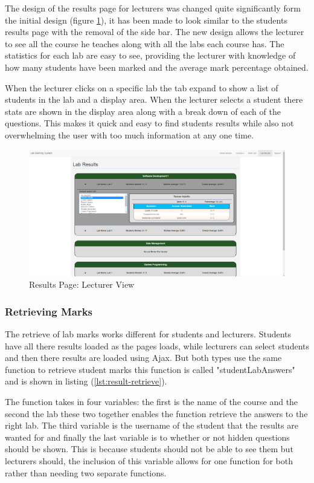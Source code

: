 \documentclass[12pt]{article}  %
\begin{document}
The design of the results page for lecturers was changed quite significantly form the initial design (figure \ref{fig:results-lecturer}), it has been made to look similar to the students results page with the removal of the side bar. The new design allows the lecturer to see all the course he teaches along with all the labs each course has. The statistics for each lab are easy to see, providing the lecturer with knowledge of how many students have been marked and the average mark percentage obtained.

When the lecturer clicks on a specific lab the tab expand to show a list of students in the lab and a display area. When the lecturer selects a student there stats are shown in the display area along with a break down of each of the questions. This makes it quick and easy to find students results while also not overwhelming the user with too much information at any one time.

\begin{figure}[H]
    \centering
    \includegraphics[width=1\textwidth]{images/implementation/lecturer-results-page.png}
    \caption{Results Page: Lecturer View}
    \label{fig:results-lecturer}
\end{figure}


\subsubsection{Retrieving Marks}

The retrieve of lab marks works different for students and lecturers. Students have all there results loaded as the pages loads, while lecturers can select students and then there results are loaded using Ajax. But both types use the same function to retrieve student marks this function is called "studentLabAnswers" and is shown in listing (\ref{lst:result-retrieve}). 

The function takes in four variables: the first is the name of the course and the second the lab these two together enables the function retrieve the answers to the right lab. The third variable is the username of the student that the results are wanted for and finally the last variable is to whether or not hidden questions should be shown. This is because students should not be able to see them but lecturers should, the inclusion of this variable allows for one function for both rather than needing two separate functions.
\end{document}
